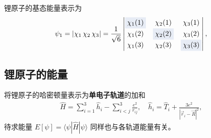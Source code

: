 
锂原子的基态能量表示为
\begin{align}
    \psi_1 = |\chi_1\,\chi_2\,\chi_3| = \frac1{\sqrt6} 
    \left|\begin{matrix}
        \colorbox{fudanBlue!10!white}{$\chi_1(1)$} & \chi_2(1) & \chi_3(1) \\
        \chi_1(2) & \colorbox{fudanBlue!10!white}{$\chi_2(2)$} & \chi_3(2) \\
        \chi_1(3) & \chi_2(3) & \colorbox{fudanBlue!10!white}{$\chi_3(3)$}
    \end{matrix}
    \right|,
\end{align}
\subsection{锂原子的能量}
将锂原子的哈密顿量表示为\textbf{单电子轨道}的加和
\begin{align}
    \hat H = \sum_{i=1}^3 \hat h_i - \sum_{i<j}^3 \frac{e^2}{r_{ij}},
    \quad
    \hat h_i = \hat T_i + \frac{3e^2}{|\vec r_i - \vec R|^2},
\end{align}
待求能量 $E[\psi] = \langle \psi | \hat H | \psi \rangle$ 同样也与各轨道能量有关。

